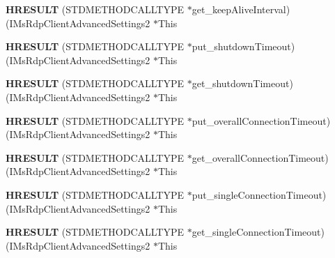 \begin{DoxyCompactItemize}
{\bfseries H\+R\+E\+S\+U\+LT} (S\+T\+D\+M\+E\+T\+H\+O\+D\+C\+A\+L\+L\+T\+Y\+PE $\ast$get\+\_\+keep\+Alive\+Interval)(I\+Ms\+Rdp\+Client\+Advanced\+Settings2 $\ast$This
\item 
\mbox{\label{struct_i_ms_rdp_client_advanced_settings2_vtbl_af52b9627878a8a1e38111ea6cbfd7a3a}} 
{\bfseries H\+R\+E\+S\+U\+LT} (S\+T\+D\+M\+E\+T\+H\+O\+D\+C\+A\+L\+L\+T\+Y\+PE $\ast$put\+\_\+shutdown\+Timeout)(I\+Ms\+Rdp\+Client\+Advanced\+Settings2 $\ast$This
\item 
\mbox{\label{struct_i_ms_rdp_client_advanced_settings2_vtbl_ae17cf566382f1267ff0b9d8b6699b18f}} 
{\bfseries H\+R\+E\+S\+U\+LT} (S\+T\+D\+M\+E\+T\+H\+O\+D\+C\+A\+L\+L\+T\+Y\+PE $\ast$get\+\_\+shutdown\+Timeout)(I\+Ms\+Rdp\+Client\+Advanced\+Settings2 $\ast$This
\item 
\mbox{\label{struct_i_ms_rdp_client_advanced_settings2_vtbl_ae7d5b55a357faa9bd86cde51e6e61019}} 
{\bfseries H\+R\+E\+S\+U\+LT} (S\+T\+D\+M\+E\+T\+H\+O\+D\+C\+A\+L\+L\+T\+Y\+PE $\ast$put\+\_\+overall\+Connection\+Timeout)(I\+Ms\+Rdp\+Client\+Advanced\+Settings2 $\ast$This
\item 
\mbox{\label{struct_i_ms_rdp_client_advanced_settings2_vtbl_a1b2ad5e6214479768d61105fa1b1336f}} 
{\bfseries H\+R\+E\+S\+U\+LT} (S\+T\+D\+M\+E\+T\+H\+O\+D\+C\+A\+L\+L\+T\+Y\+PE $\ast$get\+\_\+overall\+Connection\+Timeout)(I\+Ms\+Rdp\+Client\+Advanced\+Settings2 $\ast$This
\item 
\mbox{\label{struct_i_ms_rdp_client_advanced_settings2_vtbl_acb03f125a15328c43f05ab8ff1953710}} 
{\bfseries H\+R\+E\+S\+U\+LT} (S\+T\+D\+M\+E\+T\+H\+O\+D\+C\+A\+L\+L\+T\+Y\+PE $\ast$put\+\_\+single\+Connection\+Timeout)(I\+Ms\+Rdp\+Client\+Advanced\+Settings2 $\ast$This
\item 
\mbox{\label{struct_i_ms_rdp_client_advanced_settings2_vtbl_ac38b4102e99017bad5f4702a009e026b}} 
{\bfseries H\+R\+E\+S\+U\+LT} (S\+T\+D\+M\+E\+T\+H\+O\+D\+C\+A\+L\+L\+T\+Y\+PE $\ast$get\+\_\+single\+Connection\+Timeout)(I\+Ms\+Rdp\+Client\+Advanced\+Settings2 $\ast$This

\end{DoxyCompactItemize}
